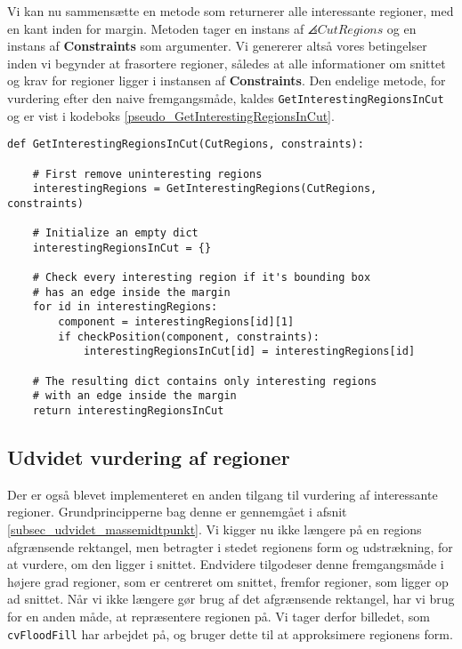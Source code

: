 {Vi kan nu sammensætte en metode som returnerer alle interessante
regioner, med en kant inden for margin. Metoden tager en instans af
$\angles{CutRegions}$ og en instans af \textbf{Constraints} som
argumenter. Vi genererer altså vores betingelser inden vi begynder at
frasortere regioner, således at alle informationer om snittet og krav
for regioner ligger i instansen af \textbf{Constraints}. Den endelige
metode, for vurdering efter den naive fremgangsmåde, kaldes
\texttt{GetInterestingRegionsInCut} og er vist i kodeboks
\ref{pseudo_GetInterestingRegionsInCut}.

\begin{lstlisting}[caption={Pseudokode, som returnerer alle interessante
    regioner, der har en kant, af deres afgrænsende rektangel, inden for
    margin.},
    captionpos=b, label={pseudo_GetInterestingRegionsInCut}, frame=tb, breaklines=false,
    float=hb]
def GetInterestingRegionsInCut(CutRegions, constraints):

    # First remove uninteresting regions
    interestingRegions = GetInterestingRegions(CutRegions, constraints)

    # Initialize an empty dict
    interestingRegionsInCut = {}

    # Check every interesting region if it's bounding box
    # has an edge inside the margin
    for id in interestingRegions:
        component = interestingRegions[id][1]
        if checkPosition(component, constraints):
            interestingRegionsInCut[id] = interestingRegions[id]

    # The resulting dict contains only interesting regions
    # with an edge inside the margin
    return interestingRegionsInCut
\end{lstlisting}

\subsection{Udvidet vurdering af regioner}
Der er også blevet implementeret en anden tilgang til vurdering af
interessante regioner. Grundprincipperne bag denne er gennemgået i
afsnit \ref{subsec_udvidet_massemidtpunkt}. Vi kigger nu ikke længere på
en regions afgrænsende rektangel, men betragter i stedet regionens
form og udstrækning, for at vurdere, om den ligger i snittet. Endvidere
tilgodeser denne fremgangsmåde i højere grad regioner, som er centreret
om snittet, fremfor regioner, som ligger op ad snittet. Når vi ikke
længere gør brug af det afgrænsende rektangel, har vi brug for en anden
måde, at repræsentere regionen på. Vi tager derfor billedet, som
\texttt{cvFloodFill} har arbejdet på, og bruger dette til at
approksimere regionens form.

}
